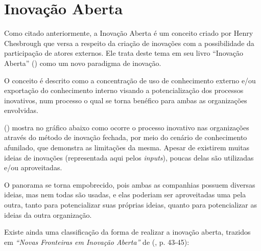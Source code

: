 \section {Inovação Aberta}
\label{inovacaoaberta}

Como citado anteriormente, a Inovação Aberta é um  conceito criado por Henry Chesbrough que versa a respeito da criação de inovações com a possibilidade da participação de atores externos. Ele trata deste tema em seu livro “Inovação Aberta” (\citeyear{chesbrough2003}) como um novo paradigma de inovação.

O conceito é descrito como a concentração de uso de conhecimento externo e/ou exportação do conhecimento interno visando a potencialização dos processos inovativos, num processo o qual se torna benéfico para ambas as organizações envolvidas.

\citeauthor{chesbrough2003} (\citeyear{chesbrough2003}) mostra no gráfico abaixo como ocorre o processo inovativo nas organizações através do método de inovação fechada, por meio do cenário de conhecimento afunilado, que demonstra as limitações da mesma. Apesar de existirem muitas ideias de inovações (representada aqui pelos \textit{inputs}), poucas delas são utilizadas e/ou aproveitadas.

O panorama se torna empobrecido, pois ambas as companhias possuem diversas ideias, mas nem todas são usadas, e elas poderiam ser aproveitadas uma pela outra, tanto para potencializar suas próprias ideias, quanto para potencializar as ideias da outra organização.



Existe ainda uma classificação da forma de realizar a inovação aberta, trazidos em \textit{“Novas Fronteiras em Inovação Aberta”} de \citeauthor{chesbrough2014} (\citeyear{chesbrough2014}, p. 43-45):



